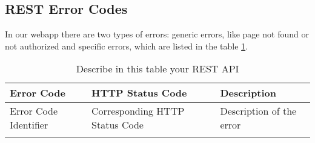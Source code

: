 \subsection{REST Error Codes}


In our webapp there are two types of errors: generic errors, 
like page not found or not authorized and specific errors, 
which are listed in the table \ref{tab:ErrorRest}.

\begin{longtable}{|p{}|p{} |p{}|} 
\hline
\textbf{Error Code} & \textbf{HTTP Status Code} & \textbf{Description} \\\hline
Error Code Identifier & Corresponding HTTP Status Code &  Description of the error \\\hline
\caption{Describe in this table your REST API}
\label{tab:ErrorRest}
\end{longtable}